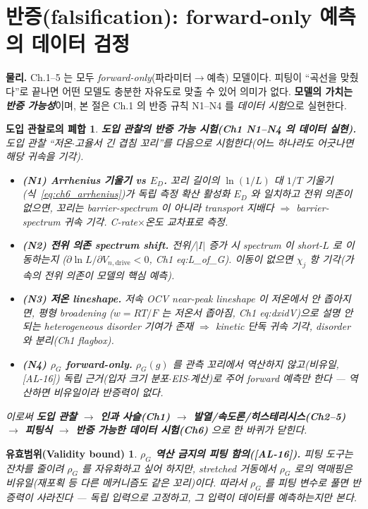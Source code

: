 \documentclass[11pt,a4paper]{article}
\newtheorem*{boundbox}{유효범위(Validity bound)}
\newtheorem*{loopbox}{도입 관찰로의 폐합}
\newcommand{\drive}{\mathrm{drive}}
\newcommand{\AL}[1]{\textsf{[AL-#1]}}
\begin{document}
\section{반증(falsification): forward-only 예측의 데이터 검정}\label{sec:ch6_falsify}
\textbf{물리.} Ch.1--5 는 모두 \emph{forward-only}(파라미터$\to$예측) 모델이다. 피팅이 ``곡선을 맞췄다''로 끝나면
어떤 모델도 충분한 자유도로 맞출 수 있어 의미가 없다. \textbf{모델의 가치는 \emph{반증 가능성}}이며, 본 절은 Ch.1
의 반증 규칙 N1--N4 를 \emph{데이터 시험}으로 실현한다.
\begin{loopbox}
\textbf{도입 관찰의 반증 가능 시험(Ch1 N1--N4 의 데이터 실현).} 도입 관찰 ``저온$\cdot$고율서 긴 겹침 꼬리''를
다음으로 시험한다(어느 하나라도 어긋나면 해당 귀속을 \emph{기각}).
\begin{itemize}[leftmargin=1.6em]
\item \textbf{(N1) Arrhenius 기울기 vs $E_D$.} 꼬리 길이의 $\ln(1/L)$ 대 $1/T$ 기울기(식~\eqref{eq:ch6_arrhenius})가
  독립 측정 확산 활성화 $E_D$ 와 \emph{일치}하고 \emph{전위 의존이 없으면}, 꼬리는 barrier-spectrum 이 아니라
  transport 지배다 $\Rightarrow$ barrier-spectrum 귀속 \emph{기각}. C-rate$\times$온도 교차표로 측정.
\item \textbf{(N2) 전위 의존 spectrum shift.} 전위/$|I|$ 증가 시 spectrum 이 short-$L$ 로 이동하는지
  ($\partial\ln L/\partial V_{n,\drive}<0$, Ch1 eq:L\_of\_G). 이동이 없으면 $\chi_j$ 항 \emph{기각}(가속의 전위
  의존이 모델의 핵심 예측).
\item \textbf{(N3) 저온 lineshape.} 저속 OCV near-peak lineshape 이 저온에서 \emph{안 좁아지면}, 평형 broadening
  ($w=RT/F$ 는 저온서 좁아짐, Ch1 eq:dxidV)으로 설명 안 되는 heterogeneous disorder 기여가 존재 $\Rightarrow$
  kinetic 단독 귀속 기각, disorder 와 분리(Ch1 flagbox).
\item \textbf{(N4) $\rho_G$ forward-only.} $\rho_G(g)$ 를 관측 꼬리에서 \emph{역산하지 않고}(비유일, \AL{16})
  독립 근거(입자 크기 분포$\cdot$EIS$\cdot$계산)로 주어 forward 예측만 한다 — 역산하면 비유일이라 반증력이 없다.
\end{itemize}
이로써 \textbf{도입 관찰 $\to$ 인과 사슬(Ch1) $\to$ 발열/속도론/히스테리시스(Ch2--5) $\to$ 피팅식 $\to$ 반증
가능한 데이터 시험(Ch6)} 으로 한 바퀴가 닫힌다.
\end{loopbox}
\begin{boundbox}
\textbf{$\rho_G$ 역산 금지의 피팅 함의(\AL{16}).} 피팅 도구는 잔차를 줄이려 $\rho_G$ 를 자유화하고 싶어 하지만,
stretched 거동에서 $\rho_G$ 로의 역매핑은 비유일(재포획 등 다른 메커니즘도 같은 꼬리)이다. 따라서 $\rho_G$ 를
피팅 변수로 풀면 반증력이 사라진다 — 독립 입력으로 고정하고, 그 입력이 데이터를 \emph{예측}하는지만 본다.
\end{boundbox}
\end{document}
